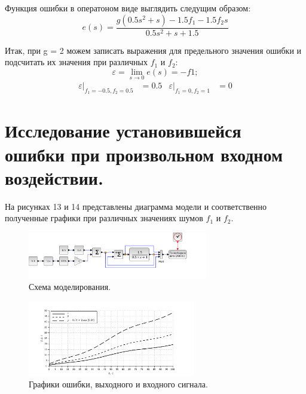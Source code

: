 \documentclass[a4paper, 11pt]{article}
\begin{document}
Функция ошибки в оператоном виде выглядить следущим образом:
\begin{equation}
    e(s) = \frac{g(0.5s^2 + s) - 1.5f_1 - 1.5f_2s}{0.5s^2 + s + 1.5}
\end{equation}
\par
Итак, при g = 2 можем записать выражения для предельного значения ошибки и подсчитать их значения при различных $f_1$ и $f_2$:
\begin{equation}
    \varepsilon = \lim_{s\rightarrow 0}{e(s)} = -f1;
\end{equation}
\begin{align*}
    \varepsilon|_{f_1 = -0.5, f_2 = 0.5} & = 0.5 & \varepsilon|_{f_1 = 0, f_2 = 1} & = 0
\end{align*}

\newpage
\section*{Исследование установившейся ошибки при произвольном входном воздействии.}
На рисунках 13 и 14 представлены диаграмма модели и соответственно полученные графики при различных значениях шумов $f_1$ и $f_2$.

\begin{figure}[h!]
    \centering
    \includegraphics[width = 0.7\textwidth]{images/model4.pdf}
    \caption{Схема моделирования.}
\end{figure}
\begin{figure}[h!]
    \centering
    \includegraphics[width = 0.65\textwidth]{images/graph4.pdf}
    \caption{Графики ошибки, выходного и входного сигнала.} 
\end{figure}
\end{document}
